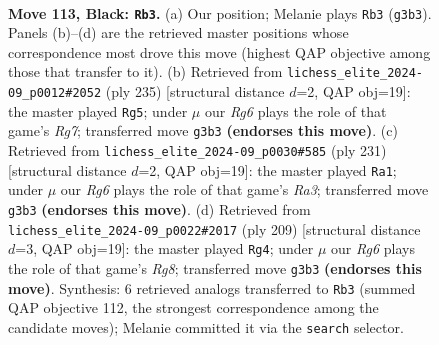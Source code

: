 \documentclass[11pt]{article}
\begin{document}
\clearpage

\begin{figure}[p]\centering
\begin{subfigure}{0.46\textwidth}\centering
\resizebox{\linewidth}{!}{%
\newchessgame
\chessboard[
  setfen={7r/8/8/5k2/8/6r1/5K2/8 b - - 1 113},
  showmover=false,
  pgfstyle=straightmove, color=movearrow, markmove={g3-b3}
]}
\caption{}
\end{subfigure}\hfill
\begin{subfigure}{0.46\textwidth}\centering
\resizebox{\linewidth}{!}{%
\newchessgame
\chessboard[
  setfen={8/7R/8/8/8/1k3K2/6r1/8 b - - 13 118},
  showmover=false,
  pgfstyle=straightmove, color=movearrow, markmove={g2-g5}
]}
\caption{}
\end{subfigure}
\\[4pt]
\begin{subfigure}{0.46\textwidth}\centering
\resizebox{\linewidth}{!}{%
\newchessgame
\chessboard[
  setfen={8/8/r7/1K6/3R4/8/8/6k1 b - - 48 116},
  showmover=false,
  pgfstyle=straightmove, color=movearrow, markmove={a6-a1}
]}
\caption{}
\end{subfigure}\hfill
\begin{subfigure}{0.46\textwidth}\centering
\resizebox{\linewidth}{!}{%
\newchessgame
\chessboard[
  setfen={1R6/8/8/8/8/k7/5K2/6r1 b - - 46 105},
  showmover=false,
  pgfstyle=straightmove, color=movearrow, markmove={g1-g4}
]}
\caption{}
\end{subfigure}
\caption{\textbf{Move 113, Black: \texttt{Rb3}.} (a) Our position; Melanie plays \texttt{Rb3} (\texttt{g3b3}). Panels (b)--(d) are the retrieved master positions whose correspondence most drove this move (highest QAP objective among those that transfer to it). (b) Retrieved from \texttt{lichess\_elite\_2024-09\_p0012\#2052} (ply 235) [structural distance $d$=2, QAP obj=19]: the master played \texttt{Rg5}; under $\mu$ our \emph{Rg6} plays the role of that game's \emph{Rg7}; transferred move \texttt{g3b3} \textbf{(endorses this move)}. (c) Retrieved from \texttt{lichess\_elite\_2024-09\_p0030\#585} (ply 231) [structural distance $d$=2, QAP obj=19]: the master played \texttt{Ra1}; under $\mu$ our \emph{Rg6} plays the role of that game's \emph{Ra3}; transferred move \texttt{g3b3} \textbf{(endorses this move)}. (d) Retrieved from \texttt{lichess\_elite\_2024-09\_p0022\#2017} (ply 209) [structural distance $d$=3, QAP obj=19]: the master played \texttt{Rg4}; under $\mu$ our \emph{Rg6} plays the role of that game's \emph{Rg8}; transferred move \texttt{g3b3} \textbf{(endorses this move)}. Synthesis: 6 retrieved analogs transferred to \texttt{Rb3} (summed QAP objective 112, the strongest correspondence among the candidate moves); Melanie committed it via the \texttt{search} selector.}
\label{fig:thought-m225}
\end{figure}
\end{document}
